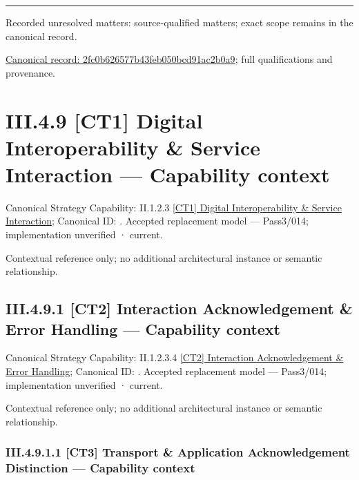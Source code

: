 \medskip\hrule\medskip

{\small Recorded unresolved matters: source-qualified matters; exact scope remains in the canonical record.}\par
{\footnotesize \href{../../../../../../../../continuum/business/business-process/2fc0b626577b43feb050bcd91ac2b0a9.md}{Canonical record: 2fc0b626577b43feb050bcd91ac2b0a9}; full qualifications and provenance.}\par
\section*{III.4.9 [CT1] Digital Interoperability \& Service Interaction — Capability context}
\label{navigation:III.4.9}

{\small Canonical Strategy Capability: II.1.2.3 \hyperref[element:2d94913dccc24c19804b426921f49a6b]{[CT1] Digital Interoperability \& Service Interaction}; Canonical ID: \texttt{}. Accepted replacement model — Pass3/014; implementation unverified · current.}\par
Contextual reference only; no additional architectural instance or semantic relationship.\par
\subsection*{III.4.9.1 [CT2] Interaction Acknowledgement \& Error Handling — Capability context}
\label{navigation:III.4.9.1}

{\small Canonical Strategy Capability: II.1.2.3.4 \hyperref[element:8bbc1201d917421ba7597aa341e850b6]{[CT2] Interaction Acknowledgement \& Error Handling}; Canonical ID: \texttt{}. Accepted replacement model — Pass3/014; implementation unverified · current.}\par
Contextual reference only; no additional architectural instance or semantic relationship.\par
\subsubsection*{III.4.9.1.1 [CT3] Transport \& Application Acknowledgement Distinction — Capability context}
\label{navigation:III.4.9.1.1}

